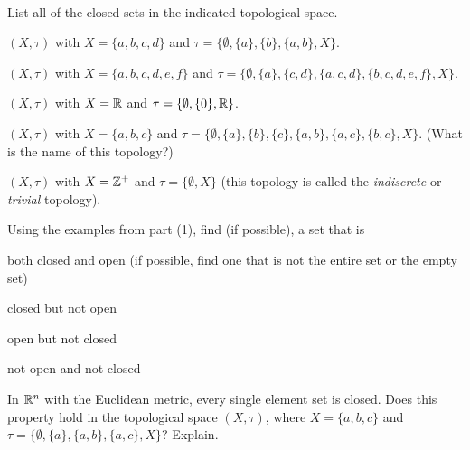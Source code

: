 \begin{pa} ~
\be
\item List all of the closed sets in the indicated topological space.
	\ba
	\item $(X, \tau)$ with $X= \{a,b,c,d\}$ and $\tau = \{\emptyset, \{a\}, \{b\}, \{a,b\}, X \}$.

	\item $(X, \tau)$ with $X= \{a,b,c,d,e,f\}$ and $\tau = \{\emptyset,\{a\}, \{c,d\}, \{a,c,d\}, \{b,c,d,e,f\}, X\}$.

	\item $(X, \tau)$ with $X = \mathbb{R}$ and $\tau = \{\emptyset, \{0\}, \mathbb{R}\}$. 

	\item $(X, \tau)$ with $X = \{a,b,c\}$ and $\tau = \{\emptyset, \{a\}, \{b\},\{c\}, \{a,b\}, \{a,c\}, \{b,c\}, X \}$. (What is the name of this topology?)

	\item $(X, \tau)$ with $X=\mathbb{Z}^+$ and $\tau = \{\emptyset, X\}$ (this topology is called the \emph{indiscrete} or \emph{trivial} topology). 

	\ea


\item Using the examples from part (1), find (if possible), a set that is
	\ba
	\item both closed and open (if possible, find one that is not the entire set or the empty set)
	
	\item closed but not open
	
	\item open but not closed
	
	\item not open and not closed

	\ea

\item In $\mathbb{R}^n$ with the Euclidean metric, every single element set is closed. Does this property hold in the topological space $(X, \tau)$, where $X = \{a, b, c\}$ and $\tau = \{\emptyset, \{a\}, \{a, b\}, \{a, c\}, X\}$? Explain. 


\ee

\end{pa}

